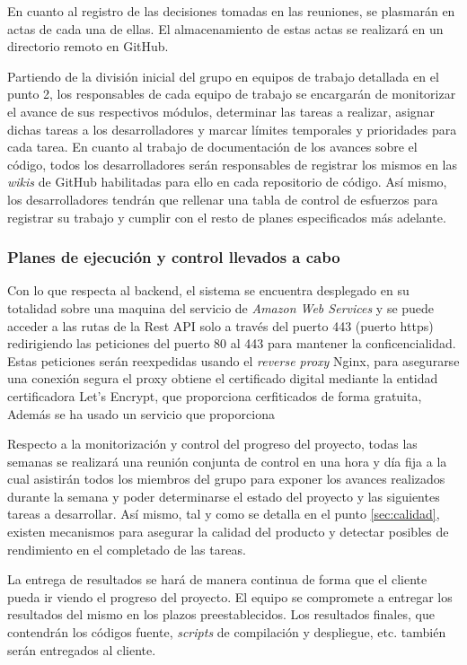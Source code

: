 \documentclass{article}
\begin{document}
En cuanto al registro de las decisiones tomadas en las reuniones, se plasmarán en actas de cada una de ellas. El almacenamiento de estas actas se realizará en un directorio remoto en GitHub.

Partiendo de la división inicial del grupo en equipos de trabajo detallada en el punto 2, los responsables de cada equipo de trabajo se encargarán de monitorizar el avance de sus respectivos módulos, determinar las tareas a realizar, asignar dichas tareas a los desarrolladores y marcar límites temporales y prioridades para cada tarea. En cuanto al trabajo de documentación de los avances sobre el código, todos los desarrolladores serán responsables de registrar los mismos en las \textit{wikis} de GitHub habilitadas para ello en cada repositorio de código. Así mismo, los desarrolladores tendrán que rellenar una tabla de control de esfuerzos para registrar su trabajo y cumplir con el resto de planes especificados más adelante.

\subsubsection*{Planes de ejecución y control llevados a cabo}

Con lo que respecta al backend, el sistema se encuentra desplegado en su totalidad sobre una maquina del servicio de \textit{Amazon Web Services} y se puede acceder a las rutas de la Rest API solo a través del puerto 443 (puerto https) redirigiendo las peticiones del puerto 80 al 443 para mantener la conficencialidad. Estas peticiones serán reexpedidas usando el \textit{reverse proxy} Nginx, para asegurarse una conexión segura el proxy obtiene el certificado digital mediante la entidad certificadora Let's Encrypt, que proporciona cerfiticados de forma gratuita, Además se ha usado un servicio que proporciona


\pagebreak

Respecto a la monitorización y control del progreso del proyecto, todas las semanas se realizará una reunión conjunta de control en una hora y día fija a la cual asistirán todos los miembros del grupo para exponer los avances realizados durante la semana y poder determinarse el estado del proyecto y las siguientes tareas a desarrollar. Así mismo, tal y como se detalla en el punto \ref{sec:calidad}, existen mecanismos para asegurar la calidad del producto y detectar posibles de rendimiento en el completado de las tareas.

La entrega de resultados se hará de manera continua de forma que el cliente pueda ir viendo el progreso del proyecto. El equipo se compromete a entregar los resultados del mismo en los plazos preestablecidos. Los resultados finales, que contendrán los códigos fuente, \textit{scripts} de compilación y despliegue, etc. también serán entregados al cliente.
\end{document}
